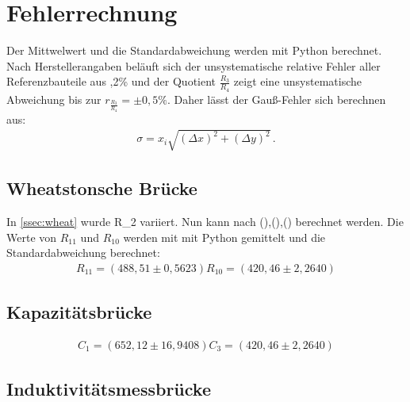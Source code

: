 \section{Fehlerrechnung}
Der Mittwelwert und die Standardabweichung werden mit Python berechnet.
Nach Herstellerangaben beläuft sich der unsystematische relative Fehler aller 
Referenzbauteile aus ,2\% und der Quotient $\frac{R_3}{R_4}$ zeigt eine
unsystematische Abweichung bis zur $r_{\frac{R_3}{R_4}} = \pm 0,5 \%$.
Daher lässt der Gauß-Fehler sich berechnen aus:
\begin{align}
    \sigma = x_i \sqrt{(\Delta x)^2 + (\Delta y)^2}\,.
\end{align}
\subsection{Wheatstonsche Brücke}
In \ref{ssec:wheat} wurde R_2 variiert. Nun kann nach (),(),() berechnet werden.
Die Werte von $R_11$ und $R_10$ werden mit mit Python gemittelt und die Standardabweichung berechnet:
\begin{align*}
    R_{11} = (488,51 \pm 0,5623)
    R_{10} = (420,46 \pm 2,2640)
\end{align*}
\subsection{Kapazitätsbrücke}
\begin{align*}
    C_1= (652,12 \pm 16,9408)
    C_3= (420,46 \pm 2,2640)
\end{align*}
\subsection{Induktivitätsmessbrücke}


\label{sec:Fehlerrechnung}